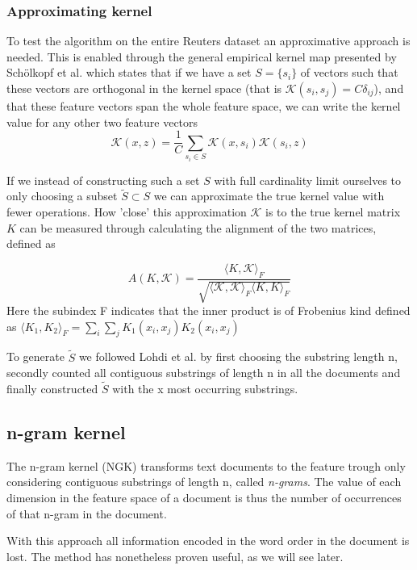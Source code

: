 \subsubsection{Approximating kernel}
To test the algorithm on the entire Reuters dataset an approximative approach is needed. This is enabled through the general empirical kernel map presented by Schölkopf et al. which states that if we have a set $ S = \{s_i\} $ of vectors such that these vectors are orthogonal in the kernel space (that is $ \mathcal{K}(s_i,s_j) = C\delta_{ij} $), and that these feature vectors span the whole feature space, we can write the kernel value for any other two feature vectors
\begin{equation}\label{eq:kernel_approx}
\mathcal{K}(x,z) = \dfrac{1}{C}\sum_{s_i \in S}\mathcal{K}(x,s_i)\mathcal{K}(s_i,z)
\end{equation}

If we instead of constructing such a set $ S $ with full cardinality limit ourselves to only choosing a subset $ \tilde{S} \subset S $ we can approximate the true kernel value with fewer operations. How 'close' this approximation $ \mathcal{K} $ is to the true kernel matrix $ K $ can be measured through calculating the alignment of the two matrices, defined as

\begin{equation}\label{key}
A(K,\mathcal{K}) = \dfrac{\langle K, \mathcal{K}\rangle_{F}}{\sqrt{\langle \mathcal{K}, \mathcal{K}\rangle_{F} \langle K, K\rangle_{F} }}
\end{equation}
Here the subindex F indicates that the inner product is of Frobenius kind defined as $ \langle K_1,K_2 \rangle_{F} = \sum_{i}\sum_{j}K_1(x_i,x_j)K_2(x_i,x_j) $ 

To generate $ \tilde{S} $ we followed Lohdi et al. by first choosing the substring length n, secondly counted all contiguous substrings of length n in all the documents and finally constructed $ \tilde{S} $ with the x most occurring substrings.

\subsection{n-gram kernel}
The n-gram kernel (NGK) transforms text documents to the feature trough only considering contiguous substrings of length n, called \textit{n-grams}. The value of each dimension in the feature space of a document is thus the number of occurrences of that n-gram in the document. 

With this approach all information encoded in the word order in the document is lost. The method has nonetheless proven useful, as we will see later.

